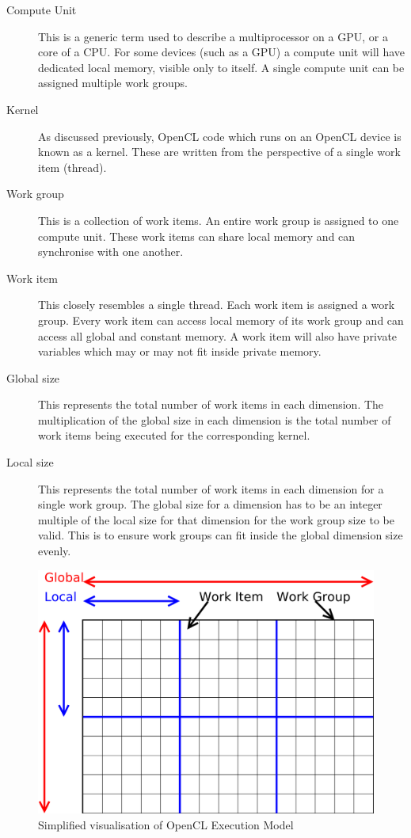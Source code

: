 \begin{description}

\item[Compute Unit] This is a generic term used to describe a multiprocessor on
a GPU, or a core of a CPU. For some devices (such as a GPU) a compute unit will
have dedicated local memory, visible only to itself. A single compute unit can
be assigned multiple work groups.

\item[Kernel] As discussed previously, OpenCL code which runs on an OpenCL
device is known as a kernel. These are written from the perspective of a single
work item (thread).

\item[Work group] This is a collection of work items. An entire work group is
assigned to one compute unit. These work items can share local memory and can
synchronise with one another.

\item[Work item] This closely resembles a single thread. Each work item is
assigned a work group. Every work item can access local memory of its work
group and can access all global and constant memory. A work item will also
have private variables which may or may not fit inside private memory.

\item[Global size] This represents the total number of work items in each
dimension. The multiplication of the global size in each dimension is the total
number of work items being executed for the corresponding kernel.

\item[Local size] This represents the total number of work items in each
dimension for a single work group. The global size for a dimension has to be an
integer multiple of the local size for that dimension for the work group size
to be valid. This is to ensure work groups can fit inside the global dimension
size evenly.

\end{description}

\begin{figure}
\includegraphics[width=\linewidth]{images/openCLExecutionModel.png}
\caption{Simplified visualisation of OpenCL Execution Model}
\label{fig:openCLExecutionModel}
\end{figure}

